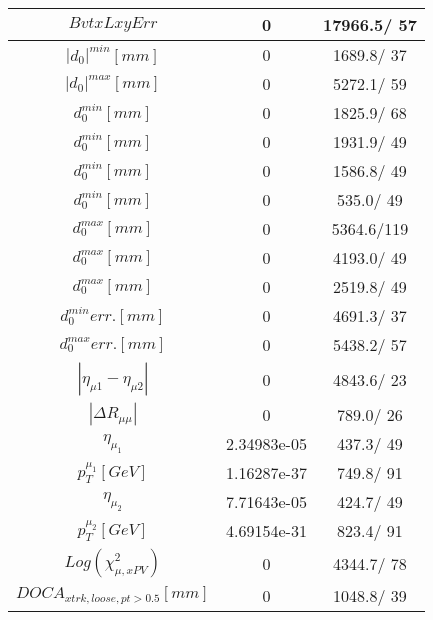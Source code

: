 \documentclass{article}
\begin{document}
\begin{table}[htbp]
\begin{center}
\begin{tabular}{c|c|c}
\hline
$BvtxLxyErr$ & 0 & 17966.5/ 57\\
\hline
$|d_{0}|^{min} [mm]$ & 0 & 1689.8/ 37\\
\hline
$|d_{0}|^{max} [mm]$ & 0 & 5272.1/ 59\\
\hline
$d_{0}^{min} [mm]$ & 0 & 1825.9/ 68\\
\hline
$d_{0}^{min} [mm]$ & 0 & 1931.9/ 49\\
\hline
$d_{0}^{min} [mm]$ & 0 & 1586.8/ 49\\
\hline
$d_{0}^{min} [mm]$ & 0 & 535.0/ 49\\
\hline
$d_{0}^{max} [mm]$ & 0 & 5364.6/119\\
\hline
$d_{0}^{max} [mm]$ & 0 & 4193.0/ 49\\
\hline
$d_{0}^{max} [mm]$ & 0 & 2519.8/ 49\\
\hline
$d_{0}^{min} err. [mm]$ & 0 & 4691.3/ 37\\
\hline
$d_{0}^{max} err. [mm]$ & 0 & 5438.2/ 57\\
\hline
$|\eta_{\mu1}-\eta_{\mu2}|$ & 0 & 4843.6/ 23\\
\hline
$|\Delta R_{\mu \mu}|$ & 0 & 789.0/ 26\\
\hline
$\eta_{\mu_{1}}$ & 2.34983e-05 & 437.3/ 49\\
\hline
$p_{T}^{\mu_{1}} [GeV]$ & 1.16287e-37 & 749.8/ 91\\
\hline
$\eta_{\mu_{2}}$ & 7.71643e-05 & 424.7/ 49\\
\hline
$p_{T}^{\mu_{2}} [GeV]$ & 4.69154e-31 & 823.4/ 91\\
\hline
$Log(\chi^{2}_{\mu,xPV})$ & 0 & 4344.7/ 78\\
\hline
$DOCA_{xtrk, loose, pt>0.5} [mm]$ & 0 & 1048.8/ 39\\
\hline
\end{tabular}
\end{center}
\end{table}
\end{document}
